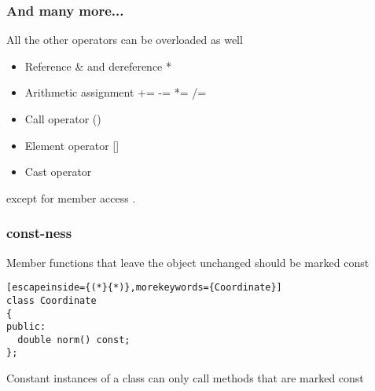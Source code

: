 \documentclass[14pt,a4paper,dvipsnames,usenames]{beamer}
\begin{document}
\begin{frame}[fragile]
  \frametitle{And many more...}

  All the other operators can be overloaded as well

  \vspace{.25em}
  \begin{itemize}
    \setlength\itemsep{.5em}
    \item Reference {\color{Tropiteal}\&} and dereference {\color{Tropiteal}*}
    \item Arithmetic assignment {\ttfamily\color{Tropiteal}+= -= *= /=}
    \item Call operator {\color{Tropiteal}()}
    \item Element operator {\color{Tropiteal}[]}
    \item Cast operator
  \end{itemize}

  \vspace{.5em}
  except for member access {\large\color{Tropiteal}.}
  
\end{frame}

\begin{frame}[fragile]
  \frametitle{{\color{FeebleWeek}const}-ness}

  Member functions that leave the object unchanged should be marked const

  \vspace{1em}
  \begin{lstlisting}[escapeinside={(*}{*)},morekeywords={Coordinate}]
class Coordinate
{
public:
  double norm() const;
};
  \end{lstlisting}

  \vspace{1em}
  Constant instances of a class can only call methods that are marked const
  
\end{frame}
\end{document}
